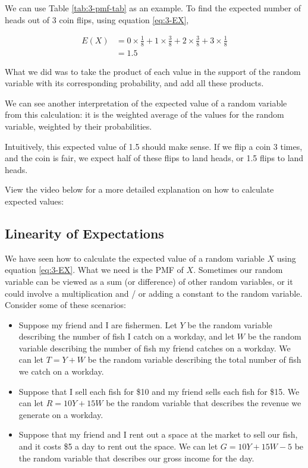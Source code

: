 \documentclass[
]{book}
\begin{document}
We can use Table \ref{tab:3-pmf-tab} as an example. To find the expected number of heads out of 3 coin flips, using equation \eqref{eq:3-EX},

\[
\begin{split}
E(X) &= 0 \times \frac{1}{8} + 1 \times \frac{3}{8} + 2 \times \frac{3}{8} + 3 \times \frac{1}{8}\\
       &= 1.5
\end{split}
\]

What we did was to take the product of each value in the support of the random variable with its corresponding probability, and add all these products.

We can see another interpretation of the expected value of a random variable from this calculation: it is the weighted average of the values for the random variable, weighted by their probabilities.

Intuitively, this expected value of 1.5 should make sense. If we flip a coin 3 times, and the coin is fair, we expect half of these flips to land heads, or 1.5 flips to land heads.

View the video below for a more detailed explanation on how to calculate expected values:

\hypertarget{linearity-of-expectations}{%
\subsection{Linearity of Expectations}\label{linearity-of-expectations}}

We have seen how to calculate the expected value of a random variable \(X\) using equation \eqref{eq:3-EX}. What we need is the PMF of \(X\). Sometimes our random variable can be viewed as a sum (or difference) of other random variables, or it could involve a multiplication and / or adding a constant to the random variable. Consider some of these scenarios:

\begin{itemize}
\item
  Suppose my friend and I are fishermen. Let \(Y\) be the random variable describing the number of fish I catch on a workday, and let \(W\) be the random variable describing the number of fish my friend catches on a workday. We can let \(T = Y+W\) be the random variable describing the total number of fish we catch on a workday.
\item
  Suppose that I sell each fish for \$10 and my friend sells each fish for \$15. We can let \(R = 10Y + 15W\) be the random variable that describes the revenue we generate on a workday.
\item
  Suppose that my friend and I rent out a space at the market to sell our fish, and it costs \$5 a day to rent out the space. We can let \(G = 10Y + 15W - 5\) be the random variable that describes our gross income for the day.
\end{itemize}
\end{document}
